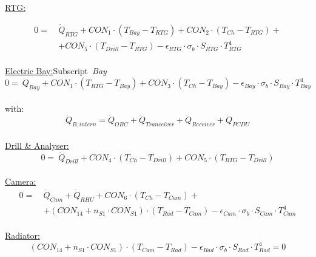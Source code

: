 \underline{RTG:}

\begin{equation}
	\begin{aligned}
		0=\  &\dot{Q}_{RTG} +CON_1 \cdot (T_{Bay}-T_{RTG})+CON_2 \cdot (T_{Ch}-T_{RTG})+ \\[1em]
		 & + CON_5 \cdot (T_{Drill}-T_{RTG})- \epsilon_{RTG}\cdot \sigma_b \cdot S_{RTG}\cdot T_{RTG}^4 \\[2em]
	\end{aligned}
\end{equation}

\underline{Electric Bay:}\quad \small{Subscript\ \textit{Bay}}
\begin{equation}0=\  \dot{Q}_{Bay}+ CON_1 \cdot (T_{RTG}-T_{Bay})+ CON_3 \cdot (T_{Ch}-T_{Bay})  -\epsilon_{Bay}\cdot \sigma_b \cdot S_{Bay}\cdot T_{Bay}^4 \end{equation}\\
with: 
\begin{equation} \dot{Q}_{B,intern} = \dot{Q}_{OBC} + \dot{Q}_{Tranceiver} +\dot{Q}_{Receiver} +\dot{Q}_{PCDU} \end{equation}\\

\underline{Drill \& Analyser:}
\begin{equation} 0= \ \dot{Q}_{Drill} +CON_4 \cdot (T_{Ch}-T_{Drill})+CON_5 \cdot (T_{RTG}-T_{Drill})   \end{equation} \\

\underline{Camera:}
\begin{equation}
	\begin{aligned}
		0=\  &  \dot{Q}_{Cam} + \dot{Q}_{RHU} +CON_6 \cdot (T_{Ch}-T_{Cam})+ \\[1em]
		& +(CON_{14} +n_{S1}\cdot CON_{S1}) \cdot (T_{Rad}-T_{Cam})  - \epsilon_{Cam}\cdot \sigma_b \cdot S_{Cam}\cdot T_{Cam}^4 \\[2em]
	\end{aligned}
\end{equation}

\underline{Radiator:}
\begin{equation}(CON_{14} +n_{S1}\cdot CON_{S1}) \cdot (T_{Cam}-T_{Rad}) - \epsilon_{Rad}\cdot \sigma_b \cdot S_{Rad}\cdot T_{Rad}^4= 0  \end{equation}  \\

